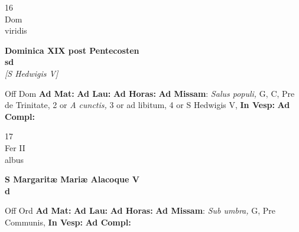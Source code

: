 \documentclass[10pt, openany]{book}
\begin{document}
        \begin{center}
            \begin{minipage}{3.5in}
                \vspace{2em}
                \begin{minipage}{0.5in}
                    {\Huge 16} \\
                    {\normalsize Dom} \\
                    {\normalsize viridis}
                \end{minipage}
                \begin{minipage}{3.0in}
                    \textbf{ \large Dominica XIX post Pentecosten \\
                    \textnormal{\normalsize sd}} \\ \textit{[S Hedwigis V]} \\ 
                \end{minipage}
                \begin{justify}Off Dom
                    \textbf{Ad Mat: }
                    \textbf{Ad Lau: }
                    \textbf{Ad Horas: }\textbf{Ad Missam}: \textit{Salus populi,} G, C, Pre de Trinitate, 2 or \textit{A cunctis,} 3 or ad libitum, 4 or S Hedwigis V,  
                    \textbf{In Vesp: }
                    \textbf{Ad Compl: }
                \end{justify}
            \end{minipage}
        \end{center}
    
        \begin{center}
            \begin{minipage}{3.5in}
                \vspace{2em}
                \begin{minipage}{0.5in}
                    {\Huge 17} \\
                    {\normalsize Fer II} \\
                    {\normalsize albus}
                \end{minipage}
                \begin{minipage}{3.0in}
                    \textbf{ \large S Margaritæ Mariæ Alacoque V \\
                    \textnormal{\normalsize d}} \\ 
                \end{minipage}
                \begin{justify}Off Ord
                    \textbf{Ad Mat: }
                    \textbf{Ad Lau: }
                    \textbf{Ad Horas: }\textbf{Ad Missam}: \textit{Sub umbra,} G, Pre Communis,  
                    \textbf{In Vesp: }
                    \textbf{Ad Compl: }
                \end{justify}
            \end{minipage}
        \end{center}
    
\end{document}
